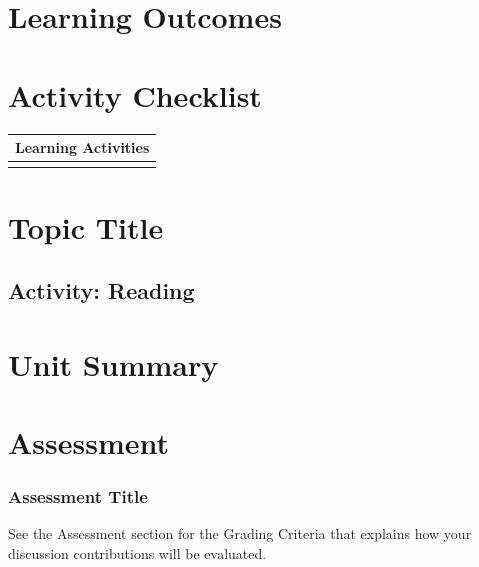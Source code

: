 \documentclass[
]{book}
\begin{document}
\hypertarget{learning-outcomes-2}{%
\section*{Learning Outcomes}\label{learning-outcomes-2}}

\hypertarget{activity-checklist-2}{%
\section*{Activity Checklist}\label{activity-checklist-2}}

\begin{longtable}[]{@{}l@{}}
\toprule
Learning Activities \\
\midrule
\endhead
 \\
\bottomrule
\end{longtable}

\hypertarget{topic-title-2}{%
\section*{Topic Title}\label{topic-title-2}}

\hypertarget{activity-reading-1}{%
\subsection*{Activity: Reading}\label{activity-reading-1}}

\begin{reflect}

\end{reflect}

\hypertarget{unit-summary-1}{%
\section*{Unit Summary}\label{unit-summary-1}}

\hypertarget{assessment-2}{%
\section*{Assessment}\label{assessment-2}}

\begin{assessment}
\hypertarget{assessment-title}{%
\subsubsection*{Assessment Title}\label{assessment-title}}

See the Assessment section for the Grading Criteria that explains how
your discussion contributions will be evaluated.
\end{assessment}
\end{document}
